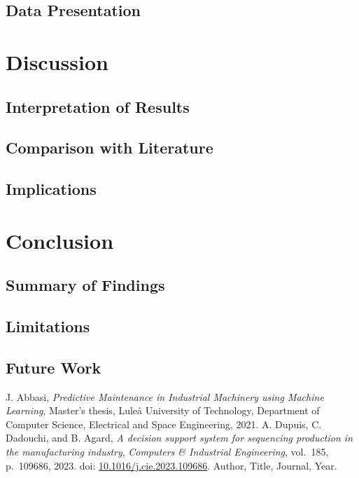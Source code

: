 \documentclass[12pt,a4paper]{report}
\begin{document}
\section{Data Presentation}

\chapter{Discussion}
\section{Interpretation of Results}
\section{Comparison with Literature}
\section{Implications}

\chapter{Conclusion}
\section{Summary of Findings}
\section{Limitations}
\section{Future Work}

\begin{thebibliography}{99}
J. Abbasi, \textit{Predictive Maintenance in Industrial Machinery using Machine Learning}, 
Master’s thesis, Luleå University of Technology, Department of Computer Science, Electrical and Space Engineering, 2021.
A. Dupuis, C. Dadouchi, and B. Agard, 
        \textit{A decision support system for sequencing production in the manufacturing industry},
\textit{Computers \& Industrial Engineering}, vol.~185, p.~109686, 2023. 
doi: \href{https://doi.org/10.1016/j.cie.2023.109686}{10.1016/j.cie.2023.109686}.
 Author, Title, Journal, Year.

\end{thebibliography}

\end{document}
